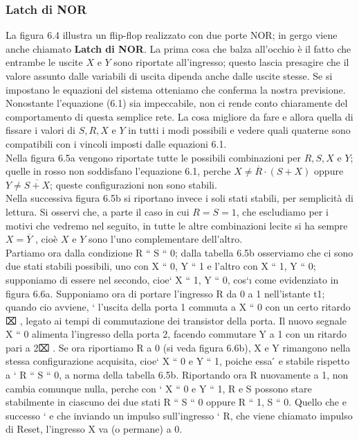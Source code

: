 \documentclass[a4paper]{extarticle}
\begin{document}
\subsubsection{Latch di NOR}
La figura 6.4 illustra un flip-flop realizzato con due porte NOR; in gergo viene anche chiamato \textbf{Latch di NOR}. La prima cosa che balza all’occhio è il fatto che entrambe le uscite \(X\) e \(Y\) sono riportate all'ingresso; questo lascia presagire che il valore assunto dalle variabili di uscita dipenda anche dalle uscite stesse. Se si impostano le equazioni del sistema otteniamo che conferma la nostra previsione. Nonostante l’equazione (6.1) sia impeccabile, non ci rende conto chiaramente
del comportamento di questa semplice rete. La cosa migliore da fare e allora quella di fissare i valori di \(S, R, X\) e \(Y\) in tutti i modi possibili e vedere quali quaterne sono compatibili con i vincoli imposti dalle equazioni 6.1.\\
Nella figura 6.5a vengono riportate tutte le possibili combinazioni per \(R, S, X\) e \(Y\); quelle in rosso non soddisfano l’equazione 6.1, perche \(X \neq \overline{R} \cdot (S + X)\) oppure \(Y \neq \overline{S + X}\); queste configurazioni non sono stabili.\\
Nella successiva figura 6.5b si riportano invece i soli stati stabili, per semplicità di lettura. Si osservi che, a parte il caso in cui \(R = S = 1\), che escludiamo per i motivi che vedremo nel seguito, in tutte le altre combinazioni lecite si ha sempre \(X = \overline{Y}\) , cioè \(X\) e \(Y\) sono l’uno complementare dell'altro.\\
Partiamo ora dalla condizione R “ S “ 0; dalla tabella 6.5b osserviamo che ci sono due stati stabili possibili, uno
con X “ 0, Y “ 1 e l’altro con X “ 1, Y “ 0; supponiamo di essere nel secondo, cioe` X “ 1, Y “ 0, cos`ı come
evidenziato in figura 6.6a. Supponiamo ora di portare l’ingresso R da 0 a 1 nell’istante t1; quando cio avviene, `
l’uscita della porta 1 commuta a X “ 0 con un certo ritardo ⌧ , legato ai tempi di commutazione dei transistor della
porta. Il nuovo segnale X “ 0 alimenta l’ingresso della porta 2, facendo commutare Y a 1 con un ritardo pari a 2⌧ .
Se ora riportiamo R a 0 (si veda figura 6.6b), X e Y rimangono nella stessa configurazione acquisita, cioe` X “ 0
e Y “ 1, poiche essa  ́ e stabile rispetto a ` R “ S “ 0, a norma della tabella 6.5b. Riportando ora R nuovamente a
1, non cambia comunque nulla, perche con ` X “ 0 e Y “ 1, R e S possono stare stabilmente in ciascuno dei due
stati R “ S “ 0 oppure R “ 1, S “ 0. Quello che e successo ` e che inviando un impulso sull’ingresso ` R, che
viene chiamato impulso di Reset, l’ingresso X va (o permane) a 0.
\end{document}
